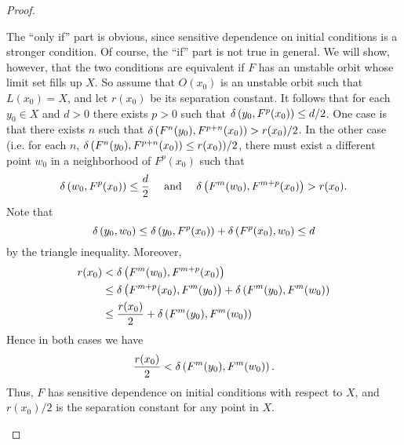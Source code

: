\documentclass[11pt]{book}
\begin{document}
\begin{proof}
\begin{enumerate}[(i)]
      The ``only if'' part is obvious, since sensitive dependence on initial conditions is a stronger condition.
      Of course, the ``if'' part is not true in general. We will show, however, 
      that the two conditions are equivalent if $F$ has an unstable orbit
      whose limit set fills up $X$.
      So assume that $O(x_0)$ is an unstable orbit such that $L(x_0) = X$,
      and let $r(x_0)$ be its separation constant.
      It follows that for each $y_0\in X$ and $d > 0$ there exists $p>0$ such that $\delta\left( y_0, F^p(x_0) \right) \leq d/2$.
      One case is that there exists $n$ such that $\delta\left( F^n(y_0), F^{p+n}(x_0) \right) > r(x_0)/2$.
      In the other case (i.e. for each $n$, $\delta\left( F^n(y_0), F^{p+n}(x_0) \right) \leq r(x_0))/2$,
      there must exist a different point $w_0$ in a neighborhood of $F^p(x_0)$ such that 
      \begin{equation*}
        \delta\left( w_0, F^p(x_0) \right) \leq \frac{d}{2} \quad \mbox{ and } \quad \delta\left( F^m(w_0), F^{m+p}(x_0) \right) > r(x_0).
      \end{equation*}
      Note that
      \begin{equation*}
        \delta\left( y_0, w_0 \right) \leq \delta\left( y_0, F^p(x_0) \right) + \delta\left( F^p(x_0), w_0 \right) \leq d
      \end{equation*}
      by the triangle inequality.
      Moreover,
      \begin{align*}
        r(x_0) &< \delta\left( F^m(w_0), F^{m+p}(x_0) \right) \\
        &\leq \delta\left( F^{m+p}(x_0), F^m(y_0) \right) + \delta\left( F^m(y_0), F^m(w_0) \right)  \\
        &\leq \frac{r(x_0)}{2} + \delta\left( F^m(y_0), F^m(w_0) \right)
      \end{align*}
      Hence in both cases we have
      \begin{equation*}
        \frac{r(x_0)}{2} < \delta\left( F^m(y_0), F^m(w_0) \right).
      \end{equation*}
      Thus, $F$ has sensitive dependence on initial conditions with respect to $X$, and 
      $r(x_0)/2$ is the separation constant for any point in $X$.
  \end{enumerate}
 
\end{proof}



\end{document}
